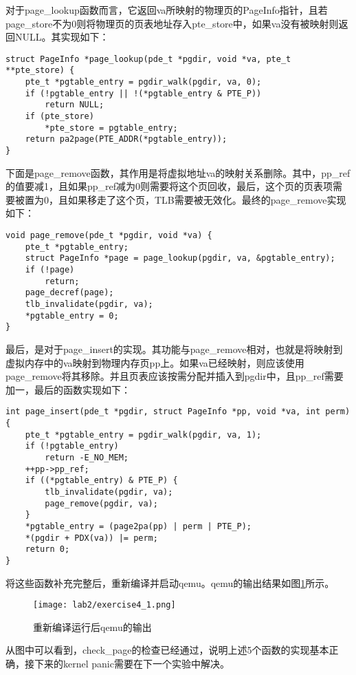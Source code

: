 \begin{exerciseSolution}{4}
    \par 对于page\_lookup函数而言，它返回va所映射的物理页的PageInfo指针，且若page\_store不为0则将物理页的页表地址存入pte\_store中，如果va没有被映射则返回NULL。其实现如下：
    \begin{lstlisting}
struct PageInfo *page_lookup(pde_t *pgdir, void *va, pte_t **pte_store) {
    pte_t *pgtable_entry = pgdir_walk(pgdir, va, 0);
    if (!pgtable_entry || !(*pgtable_entry & PTE_P))
        return NULL;
    if (pte_store)
        *pte_store = pgtable_entry;
    return pa2page(PTE_ADDR(*pgtable_entry));
}
    \end{lstlisting}

    \par 下面是page\_remove函数，其作用是将虚拟地址va的映射关系删除。其中，pp\_ref的值要减1，且如果pp\_ref减为0则需要将这个页回收，最后，这个页的页表项需要被置为0，且如果移走了这个页，TLB需要被无效化。最终的page\_remove实现如下：
    \begin{lstlisting}
void page_remove(pde_t *pgdir, void *va) {
    pte_t *pgtable_entry;
    struct PageInfo *page = page_lookup(pgdir, va, &pgtable_entry);
    if (!page)
        return;
    page_decref(page);
    tlb_invalidate(pgdir, va);
    *pgtable_entry = 0;
}
    \end{lstlisting}

    \par 最后，是对于page\_insert的实现。其功能与page\_remove相对，也就是将映射到虚拟内存中的va映射到物理内存页pp上。如果va已经映射，则应该使用page\_remove将其移除。并且页表应该按需分配并插入到pgdir中，且pp\_ref需要加一，最后的函数实现如下：
    \begin{lstlisting}
int page_insert(pde_t *pgdir, struct PageInfo *pp, void *va, int perm) {
    pte_t *pgtable_entry = pgdir_walk(pgdir, va, 1);
    if (!pgtable_entry)
        return -E_NO_MEM;
    ++pp->pp_ref;
    if ((*pgtable_entry) & PTE_P) {
        tlb_invalidate(pgdir, va);
        page_remove(pgdir, va);
    }
    *pgtable_entry = (page2pa(pp) | perm | PTE_P);
    *(pgdir + PDX(va)) |= perm;
    return 0;
}
    \end{lstlisting}

    \par 将这些函数补充完整后，重新编译并启动qemu。qemu的输出结果如图\ref{fig:lab2/exercise4_1}所示。
    \begin{figure}[htb]
        \centering
        \texttt{[image: lab2/exercise4\_1.png]}
        \caption{重新编译运行后qemu的输出}
        \label{fig:lab2/exercise4_1}
    \end{figure}
    \par 从图中可以看到，check\_page的检查已经通过，说明上述5个函数的实现基本正确，接下来的kernel panic需要在下一个实验中解决。
    \FloatBarrier
\end{exerciseSolution}

